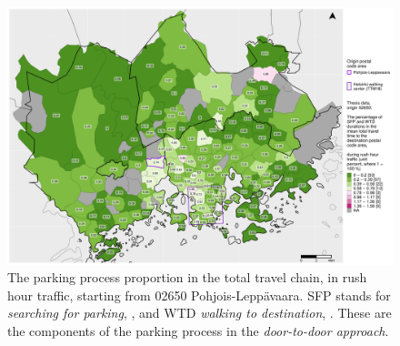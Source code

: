 \begin{figure}
    \section{}
    \centering
    \includegraphics[trim={0.9cm 0.3cm 0.25cm 0.3cm},clip,width=\textwidth]{images/compare_traveltimes_mapfill-msc_r_pct_fromzip-02650_11-10-2020.png}
    \caption[Parking process proportion from Pohjois-Leppävaara, rush hour traffic]{The parking process proportion in the total travel chain, in rush hour traffic, starting from 02650 Pohjois-Leppävaara. SFP stands for \textit{searching for parking}, , and WTD \textit{walking to destination}, . These are the components of the parking process in the \textit{door-to-door approach}.}%
    \label{fig:compare_msc_r_pct_02650}%
\end{figure}

